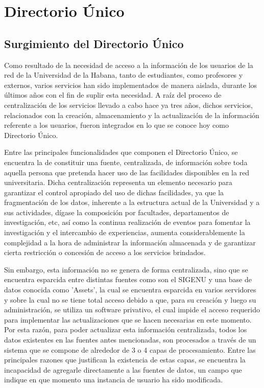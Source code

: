 \chapter{Directorio \'Unico}

\section{Surgimiento del Directorio \'Unico}

Como resultado de la necesidad de acceso a la informaci\'on de los usuarios de la red de la Universidad de la Habana, tanto de estudiantes, como profesores y externos, varios servicios han sido implementados de manera aislada, durante los \'ultimos años con el fin de suplir esta necesidad. A ra\'iz del proceso de centralizaci\'on de los servicios llevado a cabo hace ya tres años, dichos servicios, relacionados con la creaci\'on, almacenamiento y la actualizaci\'on de la informaci\'on referente a los usuarios, fueron integrados en lo que se conoce hoy como Directorio \'Unico.

Entre las principales funcionalidades que componen el Directorio \'Unico, se encuentra la de constituir una fuente, centralizada, de informaci\'on sobre toda aquella persona que pretenda hacer uso de las facilidades disponibles en la red universitaria. Dicha centralizaci\'on representa un elemento necesario para garantizar el control apropiado del uso de dichas facilidades, ya que la fragmentaci\'on de los datos, inherente a la estructura actual de la Universidad y a sus actividades, d\'igase la composici\'on por facultades, departamentos de investigaci\'on, etc, as\'i como la continua realizaci\'on de eventos para fomentar la investigaci\'on y el intercambio de experiencias, aumenta considerablemente la complejidad a la hora de administrar la informaci\'on almacenada y de garantizar cierta restricci\'on o concesi\'on de acceso a los servicios brindados. 

Sin embargo, esta informaci\'on no se genera de forma centralizada, sino que se encuentra esparcida entre distintas fuentes como son el SIGENU y una base de datos conocida como 'Assets', la cual se encuentra esparcida en varios servidores y sobre la cual no se tiene total acceso debido a que, para su creaci\'on y luego su administraci\'on, se utiliza un software privativo, el cual impide el acceso requerido para implementar las actualizaciones que se hacen necesarias en este momento.  
Por esta raz\'on, para poder actualizar esta informaci\'on centralizada, todos los datos existentes en las fuentes antes mencionadas, son procesados a trav\'es de un sistema que se compone de alrededor de 3 o 4 capas de procesamiento. Entre las principales razones que justifican la existencia de estas capas, se encuentra la incapacidad de agregarle directamente a las fuentes de datos, un campo que indique en que momento una instancia de usuario ha sido modificada.

